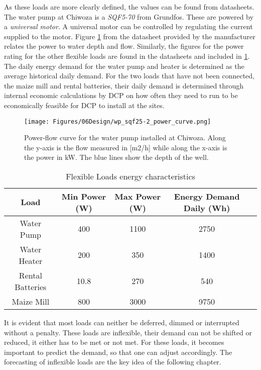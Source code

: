 As these loads are more clearly defined, the values can be found from datasheets\cite{wp_documentation}\cite{water_heater}\cite{maize_mill}. The water pump at Chiwoza is a \textit{SQF5-70} from Grundfos. These are powered by  a \textit{universal motor}. A universal motor can be controlled by regulating the current supplied to the motor. Figure \ref{fig:wp_power_flow_curve} from the datasheet provided by the manufacturer relates the power to water depth and flow. Similarly, the figures for the power rating for the other flexible loads are found in the datasheets and included in \ref{tab:flexible_loads_characteristics}. The daily energy demand for the water pump and heater is determined as the average historical daily demand. For the two loads that have not been connected, the maize mill and rental batteries, their daily demand is determined through internal economic calculations by DCP on how often they need to run to be economically feasible for DCP to install at the sites.\\

\begin{figure}
    \centering
    \texttt{[image: Figures/06Design/wp\_sqf25-2\_power\_curve.png]}
    \caption[Water pump power/flow-curve]{Power-flow curve for the water pump installed at Chiwoza. Along the y-axis is the flow measured in [m2/h] while along the x-axis is the power in kW. The blue lines show the depth of the well.}
    \label{fig:wp_power_flow_curve}
\end{figure}

\begin{table}[]
    \centering
    \begin{tabular}{c|c|c|c|c}
       Load  & Min Power (W) & Max Power (W)& Energy Demand Daily (Wh) \\
       \hline
       Water Pump  & 400 & 1100 & 2750 \\
       Water Heater  & 200 & 350 & 1400 \\
       Rental Batteries  & 10.8 & 270 & 540 \\
       Maize Mill  & 800 & 3000 & 9750 \\
    \end{tabular}
    \caption[Flexible Loads energy characteristics]{Flexible Loads energy characteristics}
    \label{tab:flexible_loads_characteristics}
\end{table}

It is evident that most loads can neither be deferred, dimmed or interrupted without a penalty. These loads are inflexible, their demand can not be shifted or reduced, it either has to be met or not met. For these loads, it becomes important to predict the demand, so that one can adjust accordingly. The forecasting of inflexible loads are the key idea of the following chapter. 


